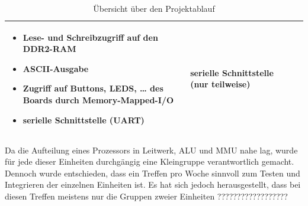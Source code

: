 \begin{table}[H]
\begin{tabular}{|p{50pt}|p{80pt}|p{220pt}|p{110pt}|}
\begin{itemize}[noitemsep,topsep=0pt]
                                                       \item Lese- und Schreibzugriff auf den DDR2-RAM
                                                       \item ASCII-Ausgabe
                                                       \item Zugriff auf Buttons, LEDS, \dots{} des Boards durch Memory-Mapped-I/O
                                                       \item serielle Schnittstelle (UART)
                                                       \end{itemize}                                                                    & serielle Schnittstelle (nur teilweise)        \\
\hline
\end{tabular}
\caption{\"Ubersicht \"uber den Projektablauf}
\end{table}

Da die Aufteilung eines Prozessors in Leitwerk, ALU und MMU nahe lag, wurde
f\"ur jede dieser Einheiten durchg\"angig eine Kleingruppe verantwortlich
gemacht. Dennoch wurde entschieden, dass ein Treffen pro Woche sinnvoll zum
Testen und Integrieren der einzelnen Einheiten ist. Es hat sich jedoch
herausgestellt, dass bei diesen Treffen meistens nur die Gruppen zweier
Einheiten ??????????????????

